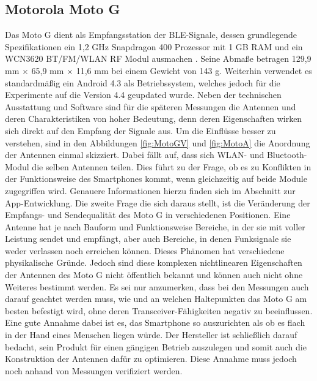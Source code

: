 \subsection{Motorola Moto G}
Das Moto G dient als Empfangsstation der BLE-Signale, dessen grundlegende Spezifikationen ein 1,2 GHz Snapdragon 400 Prozessor mit 1 GB RAM und ein WCN3620 BT/FM/WLAN RF Modul ausmachen \cite{Moto}. Seine Abmaße betragen 129,9 mm $\times$ 65,9 mm $\times$ 11,6  mm bei einem Gewicht von 143 g. Weiterhin verwendet es standardmäßig ein Android 4.3 als Betriebssystem, welches jedoch für die Experimente auf die Version 4.4 geupdated wurde. Neben der technischen Ausstattung und Software sind für die späteren Messungen die Antennen und deren Charakteristiken von hoher Bedeutung, denn deren Eigenschaften wirken sich direkt auf den Empfang der Signale aus. Um die Einflüsse besser zu verstehen, sind in den Abbildungen \ref{fig:MotoGV} und \ref{fig:MotoA} die Anordnung der Antennen einmal skizziert. Dabei fällt auf, dass sich WLAN- und Bluetooth-Modul die selben Antennen teilen. Dies führt zu der Frage, ob es zu Konflikten in der Funktionsweise des Smartphones kommt, wenn gleichzeitig auf beide Module zugegriffen wird. Genauere Informationen hierzu finden sich im Abschnitt zur App-Entwicklung. Die zweite Frage die sich daraus stellt, ist die Veränderung der Empfangs- und Sendequalität des Moto G in verschiedenen Positionen. Eine Antenne hat je nach Bauform und Funktionsweise Bereiche, in der sie mit voller Leistung sendet und empfängt, aber auch Bereiche, in denen Funksignale sie weder verlassen noch erreichen können. Dieses Phänomen hat verschiedene physikalische Gründe. Jedoch sind diese komplexen nichtlinearen Eigenschaften der Antennen des Moto G nicht öffentlich bekannt und können auch nicht ohne Weiteres bestimmt werden. Es sei nur anzumerken, dass bei den Messungen auch darauf geachtet werden muss, wie und an welchen Haltepunkten das Moto G am besten befestigt wird, ohne deren Transceiver-Fähigkeiten negativ zu beeinflussen. Eine gute Annahme dabei ist es, das Smartphone so auszurichten als ob es flach in der Hand eines Menschen liegen würde. Der Hersteller ist schließlich darauf bedacht, sein Produkt für einen gängigen Betrieb auszulegen und somit auch die Konstruktion der Antennen dafür zu optimieren. Diese Annahme muss jedoch noch anhand von Messungen verifiziert werden.
